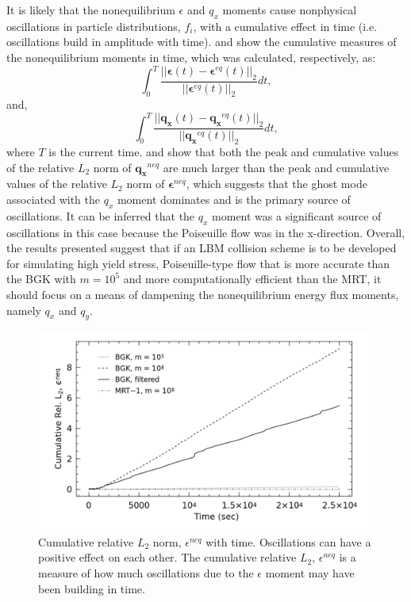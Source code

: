 It is likely that the nonequilibrium $\epsilon$ and $q_x$ moments cause nonphysical oscillations in particle distributions, $f_i$, with a cumulative effect in time (i.e. oscillations build in amplitude with time).
 and  show the cumulative measures of the nonequilibrium moments in time, which was calculated, respectively, as:
\begin{equation}
  \int_0^{T} \frac{||\boldsymbol{\epsilon}(t) - \boldsymbol{\epsilon}^{eq}(t)||_2}{||\boldsymbol{\epsilon}^{eq}(t)||_2} dt,
\end{equation}
\noindent and,
\begin{equation}
  \int_0^{T} \frac{||\mathbf{q_x}(t) - \mathbf{q_x}^{eq}(t)||_2}{||\mathbf{q_x}^{eq}(t)||_2} dt,
\end{equation}
\noindent where $T$ is the current time. 
 and  show that both the peak and cumulative values of the relative $L_2$ norm of $\mathbf{q_x}^{neq}$ are much larger than the peak and cumulative values of the relative $L_2$ norm of $\boldsymbol{\epsilon}^{neq}$, which suggests that the ghost mode associated with the $q_x$ moment dominates and is the primary source of oscillations.
It can be inferred that the $q_x$ moment was a significant source of oscillations in this case because the Poiseuille flow was in the x-direction.
Overall, the results presented suggest that if an LBM collision scheme is to be developed for simulating high yield stress, Poiseuille-type flow that is more accurate than the BGK with $m = 10^5$ and more computationally efficient than the MRT, it should focus on a means of dampening the nonequilibrium energy flux moments, namely $q_x$ and $q_y$.

\begin{figure}
    \includegraphics[width=\linewidth]{figs/poise-bingham/epsilon_cumulative}
    \caption{Cumulative relative $L_2$ norm, $\epsilon^{neq}$ with time. Oscillations can have a positive effect on each other. The cumulative relative $L_2$, $\epsilon^{neq}$ is a measure of how much oscillations due to the $\epsilon$ moment may have been building in time.}
    \label{fig:epsilon-cumulative}
\end{figure}

